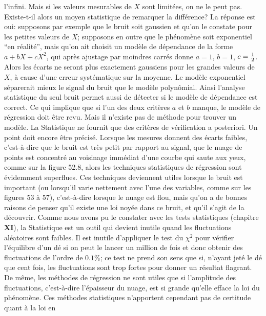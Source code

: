 l'infini.  Mais si les valeurs mesurables de $X$ sont limit\'ees, on ne le 
peut pas. Existe-t-il alors un moyen statistique de remarquer la 
diff\'erence? La r\'eponse est oui: supposons par exemple que le bruit 
soit gaussien et qu'on le constate pour les petites valeurs de $X$; 
supposons en outre que le ph\'enom\`ene soit exponentiel ``en 
r\'ealit\'e'', mais qu'on ait choisit un mod\`ele de d\'ependance de la 
forme $a + bX + cX^2$, qui apr\`es ajustage par moindres carr\'es donne 
$a=1$, $b=1$, $c={1\over 2}$.  Alors les \'ecarts ne seront plus 
exactement gaussiens pour les grandes valeurs de $X$, \`a cause d'une 
erreur syst\'ematique sur la moyenne.  Le mod\`ele exponentiel 
s\'eparerait mieux le signal du bruit que le mod\`ele polyn\^omial. 
\medskip 
Ainsi l'analyse statistique du seul bruit permet aussi de d\'etecter si
le mod\`ele de d\'ependance est correct. 
\medskip 
Ce qui implique que si l'un des deux crit\`eres $a$ et $b$ manque, le 
mod\`ele de r\'egression doit \^etre revu. Mais il n'existe pas de 
m\'ethode pour trouver un mod\`ele. La Statistique ne fournit que
des crit\`eres de v\'erification a posteriori. 
\medskip 
Un point doit encore \^etre pr\'ecis\'e. Lorsque les mesures donnent
des \'ecarts faibles, c'est-\`a-dire que le bruit est tr\`es petit par 
rapport au \hbox{signal}, que le nuage de points est concentr\'e au 
voisinage imm\'ediat d'une courbe qui saute aux yeux, comme sur la 
figure 52.8, alors les techniques statistiques de r\'egression sont 
\'evidemment superflues. Ces techniques deviennent utiles lorsque le 
bruit est important (ou lorsqu'il varie nettement avec l'une des 
variables,  comme sur les figures 53 \`a 57), c'est-\`a-dire lorsque le 
nuage est flou,  mais qu'on a de bonnes raisons de penser qu'il existe 
une loi noy\'ee dans ce bruit, et qu'il s'agit de la d\'ecouvrir. Comme 
nous avons pu le constater avec les tests statistiques (chapitre {\bf 
XI}),  la Statistique est un outil qui devient inutile quand les 
fluctuations al\'eatoires sont faibles. Il est inutile d'appliquer le test 
du $\chi^2$ pour v\'erifier l'\'equilibre d'un d\'e si on peut le lancer un 
million de fois et donc obtenir des fluctuations de l'ordre de $0.1\%$; 
ce test ne prend son sens que si, n'ayant jet\'e le d\'e que cent fois, les 
fluctuations sont trop fortes pour donner un r\'esultat flagrant. De 
m\^eme, les m\'ethodes de r\'egression ne sont utiles que si 
l'amplitude des fluctuations, c'est-\`a-dire l'\'epaisseur du nuage, est 
si grande qu'elle efface la loi du ph\'enom\`ene.  Ces m\'ethodes 
statistiques n'apportent cependant pas de certitude quant \`a la loi en 
